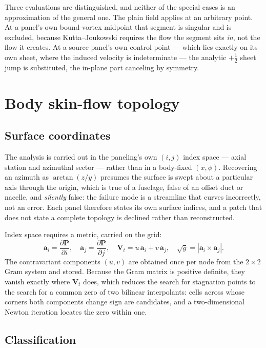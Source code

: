 \documentclass[submit]{aiaa-tc}%
\begin{document}
Three evaluations are distinguished, and neither of the special cases is
an approximation of the general one. The plain field applies at an
arbitrary point. At a panel's own bound-vortex midpoint that segment is
singular and is excluded, because Kutta--Joukowski requires the flow the
segment sits \emph{in}, not the flow it creates. At a source panel's own
control point --- which lies exactly on its own sheet, where the induced
velocity is indeterminate --- the analytic $+\tfrac12$ sheet jump is
substituted, the in-plane part canceling by symmetry.

\section{Body skin-flow topology}
\label{sec:body}

\subsection{Surface coordinates}

The analysis is carried out in the paneling's own $(i,j)$ index space ---
axial station and azimuthal sector --- rather than in a body-fixed
$(x,\phi)$. Recovering an azimuth as $\arctan(z/y)$ presumes the surface
is swept about a particular axis through the origin, which is true of a
fuselage, false of an offset duct or nacelle, and \emph{silently} false:
the failure mode is a streamline that curves incorrectly, not an error.
Each panel therefore states its own surface indices, and a patch that does
not state a complete topology is declined rather than reconstructed.

Index space requires a metric, carried on the grid:
%
\begin{equation}
  \mathbf{a}_i = \frac{\partial \mathbf{P}}{\partial i}, \quad
  \mathbf{a}_j = \frac{\partial \mathbf{P}}{\partial j}, \quad
  \mathbf{V}_t = u\,\mathbf{a}_i + v\,\mathbf{a}_j, \quad
  \sqrt{g} = |\mathbf{a}_i \times \mathbf{a}_j| .
\end{equation}
%
The contravariant components $(u,v)$ are obtained once per node from the
$2\times2$ Gram system and stored. Because the Gram matrix is positive
definite, they vanish exactly where $\mathbf{V}_t$ does, which reduces the
search for stagnation points to the search for a common zero of two
bilinear interpolants: cells across whose corners both components change
sign are candidates, and a two-dimensional Newton iteration locates the
zero within one.

\subsection{Classification}
\end{document}
